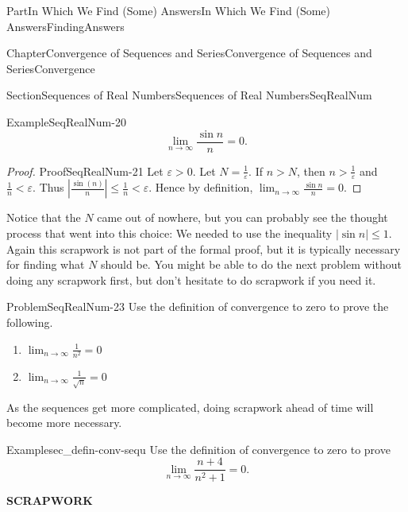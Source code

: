 \documentclass[oneside,10pt,]{book}
\newcommand{\terminology}[1]{\textbf{#1}}
\numberwithin{equation}{part}
\newcommand{\abs}[1]{\left|#1\right|}
\def\limit#1#2#3{{\displaystyle\lim_{#1\rightarrow #2}#3}}
\def\limitt#1#2#3{{\displaystyle\lim_{#1\rightarrow #2}\textstyle #3}}
\newcommand{\eps}{\varepsilon}
\newcommand{\lt}{<}
\begin{document}
\begin{partptx}{Part}{In Which We Find (Some) Answers}{}{In Which We Find (Some) Answers}{}{}{FindingAnswers}
\begin{chapterptx}{Chapter}{Convergence of Sequences and Series}{}{Convergence of Sequences and Series}{}{}{Convergence}
\begin{sectionptx}{Section}{Sequences of Real Numbers}{}{Sequences of Real Numbers}{}{}{SeqRealNum}
\begin{example}{Example}{}{SeqRealNum-20}
\begin{equation*}
\lim_{n\rightarrow\infty}\frac{\sin n}{n}=0\text{.}
\end{equation*}
%
\end{example}
\begin{proof}{Proof}{}{SeqRealNum-21}
Let \(\eps>0\). Let \(N=\frac{1}{\eps}\). If \(n>N\), then \(n>\frac{1}{\eps}\) and \(\frac{1}{n}\lt \eps\). Thus \(\abs{\frac{\sin(n)}{n}}\leq\frac{1}{n}\lt \eps\). Hence by definition, \(\limitt{n}{\infty}{\frac{\sin n}{n}}=0\).%
\end{proof}
Notice that the \(N\) came out of nowhere, but you can probably see the thought process that went into this choice: We needed to use the inequality \(\abs{\sin n}\leq 1\). Again this scrapwork is not part of the formal proof, but it is typically necessary for finding what \(N\) should be. You might be able to do the next problem without doing any scrapwork first, but don't hesitate to do scrapwork if you need it.%
\begin{problem}{Problem}{}{SeqRealNum-23}%
 Use the definition of convergence to zero to prove the following.%
\begin{enumerate}[font=\bfseries,label=(\alph*),ref=\alph*]%
\item{}\(\limit{n}{\infty}{\frac{1}{n^2}}=0\)%
\item{}\(\limit{n}{\infty}{\frac{1}{\sqrt{n}}}=0\)%
\end{enumerate}%
\end{problem}
As the sequences get more complicated, doing scrapwork ahead of time will become more necessary.%
\begin{example}{Example}{}{sec_defin-conv-sequ}%
Use the definition of convergence to zero to prove%
\begin{equation*}
\limit{n}{\infty}{\frac{n+4}{n^2+1}}=0\text{.}
\end{equation*}
%
\par
\terminology{SCRAPWORK}%
\par

\end{example}
\end{sectionptx}
\end{chapterptx}
\end{partptx}
\end{document}
